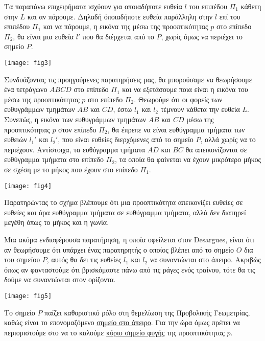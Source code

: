 \documentclass[12pt, a4paper]{book}
\begin{document}
Τα παραπάνω επιχειρήματα ισχύουν για οποιαδήποτε ευθεία $l$ του επιπέδου $Π_1$ κάθετη στην $L$ και αν πάρουμε. Δηλαδή όποιαδήποτε ευθεία παράλληλη στην $l$ επί του επιπέδου $Π_1$ και να πάρουμε, η εικόνα της μέσω της προοπτικότητας $p$ στο επίπεδο $Π_2$, θα είναι μια ευθεία $l'$ που θα διέρχεται από το $P$, χωρίς όμως να περιέχει το σημείο $P$.

\begin{center}
\texttt{[image: fig3]}
\end{center}

Συνδυάζοντας τις προηγούμενες παρατηρήσεις μας, θα μπορούσαμε να θεωρήσουμε ένα τετράγωνο $ABCD$ στο επίπεδο $Π_1$ και να εξετάσουμε ποια είναι η εικόνα του μέσω της προοπτικότητας $p$ στο επίπεδο $Π_2$. Θεωρούμε ότι οι φορείς των ευθυγράμμων τμημάτων $AB$ και $CD$, έστω $l_1$ και $l_2$ τέμνουν κάθετα την ευθεία $L$. Συνεπώς, η εικόνα των ευθυγράμμων τμημάτων $AB$ και $CD$ μέσω της προοπτικότητας $p$ στον επίπεδο $Π_2$, θα έπρεπε να είναι ευθύγραμμα τμήματα των ευθειών $l_1'$ και $l_2'$, που είναι ευθείες διερχόμενες από το σημείο $P$, αλλά χωρίς να το περιέχουν. Αντίστοιχα, τα ευθύγραμμα τμήματα $AD$ και $BC$ θα απεικονίζονται σε ευθύγραμμα τμήματα στο επίπεδο $Π_2$, τα οποία θα φαίνεται να έχουν μικρότερο μήκος σε σχέση με το μήκος που έχουν στο επίπεδο $Π_1$. 

\begin{center}
\texttt{[image: fig4]}
\end{center}	

Παρατηρώντας το σχήμα βλέπουμε ότι μια προοπτικότητα απεικονίζει ευθείες σε ευθείες και άρα ευθύγραμμα τμήματα σε ευθύγραμμα τμήματα, αλλά δεν διατηρεί μεγέθη όπως το μήκος και η γωνία.

Μια ακόμα ενδιαφέρουσα παρατήρηση, η οποία οφείλεται στον  \foreignlanguage{english}{Desargues}, είναι ότι αν θεωρήσουμε ότι υπάρχει ένας παρατηρητής ο οποίος βλέπει από το σημείο $Ο$ δια του σημείου $P$, αυτός θα δει τις ευθείες $l_1$ και $l_2$ να συναντώνται στο άπειρο. Ακριβώς όπως αν φανταστούμε ότι βρισκόμαστε πάνω από τις ράγες ενός τραίνου, τότε θα τις δούμε να συναντώνται στον ορίζοντα.

\begin{center}
\texttt{[image: fig5]}
\end{center}

Το σημείο $P$ παίζει καθοριστικό ρόλο στη θεμελίωση της Προβολικής Γεωμετρίας, καθώς είναι το επονομαζόμενο \underline{σημείο στο άπειρο}. Για την ώρα όμως πρέπει να περιοριστούμε στο να το καλούμε \underline{κύριο σημείο φυγής} της προοπτικότητας $p$. 
\end{document}
